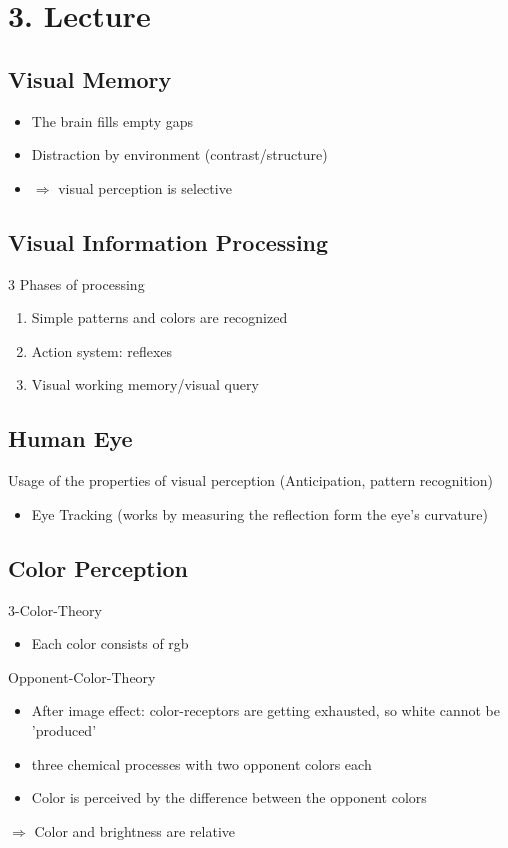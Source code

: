 \documentclass[10pt,a4paper]{article}
\begin{document}
	
	\section{3. Lecture}
	\subsection{Visual Memory}
	\begin{itemize}
		\item The brain fills empty gaps
		\item Distraction by environment (contrast/structure)
		\item $ \Rightarrow $ visual perception is selective
	\end{itemize}
	\subsection{Visual Information Processing}
	3 Phases of processing
	\begin{enumerate}
		\item Simple patterns and colors are recognized
		\item Action system: reflexes
		\item Visual working memory/visual query
	\end{enumerate}
	\subsection*{Human Eye}
	Usage of the properties of visual perception (Anticipation, pattern recognition)
	\begin{itemize}
		\item Eye Tracking (works by measuring the reflection form the eye's curvature)
	\end{itemize}
	
	\subsection{Color Perception}
	3-Color-Theory
	\begin{itemize}
		\item Each color consists of rgb
	\end{itemize}
	Opponent-Color-Theory
	\begin{itemize}
		\item After image effect: color-receptors are getting exhausted, so white cannot be 'produced'
		\item three chemical processes with two opponent colors each 
		\item Color is perceived by the difference between the opponent colors
	\end{itemize}
	$ \Rightarrow $ Color and brightness are relative
	
\end{document}

